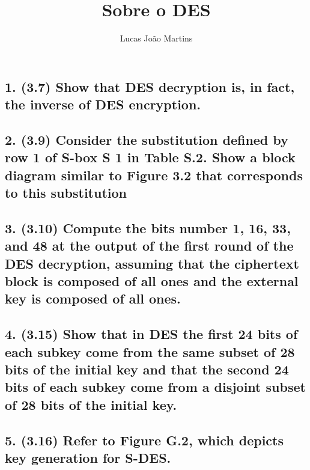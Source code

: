 \documentclass[12pt]{article}
\title{Sobre o DES}
\author{Lucas João Martins}
\date{}
\begin{document}
\maketitle

\section*{}
\subsection*{1. (3.7) Show that DES decryption is, in fact, the inverse of DES
encryption.}

\subsection*{2. (3.9) Consider the substitution defined by row 1 of S-box S 1 in
Table S.2. Show a block diagram similar to Figure 3.2 that corresponds to this
substitution}

\subsection*{3. (3.10) Compute the bits number 1, 16, 33, and 48 at the output of
the first round of the DES decryption, assuming that the ciphertext block is
composed of all ones and the external key is composed of all ones.}

\subsection*{4. (3.15) Show that in DES the first 24 bits of each subkey come
from the same subset of 28 bits of the initial key and that the second 24 bits
of each subkey come from a disjoint subset of 28 bits of the initial key.}

\subsection*{5. (3.16) Refer to Figure G.2, which depicts key generation for
S-DES.}
\end{document}
